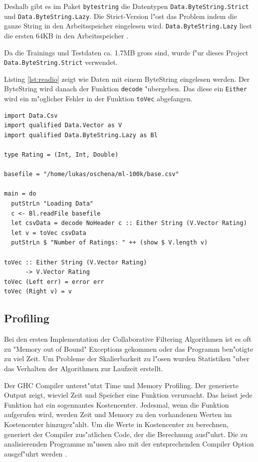 \documentclass[a4paper, 12pt]{article}
\begin{document}
Deshalb gibt es im Paket \verb|bytestring| die Datentypen \verb|Data.ByteString.Strict| und \verb|Data.ByteString.Lazy|. Die Strict-Version l"ost das Problem indem die ganze String in den Arbeitsspeicher eingelesen wird. \verb|Data.ByteString.Lazy| liest die ersten 64KB in den Arbeitsspeicher \cite{Lipovaca}.

Da die Trainings und Testdaten ca. 1.7MB gross sind, wurde f"ur dieses Project \verb|Data.ByteString.Strict| verwendet.

Listing \ref{lst:readio} zeigt wie Daten mit einem ByteString eingelesen werden. Der ByteString wird danach der Funktion \verb|decode| "ubergeben. Das diese ein \verb|Either| wird ein m"oglicher Fehler in der Funktion \verb|toVec| abgefangen.

\begin{lstlisting}[label={lst:readio},caption={Einlesen von Files mit ByteString}]
import Data.Csv
import qualified Data.Vector as V
import qualified Data.ByteString.Lazy as Bl

type Rating = (Int, Int, Double)

basefile = "/home/lukas/oschena/ml-100k/base.csv"

main = do
  putStrLn "Loading Data"
  c <- Bl.readFile basefile
  let csvData = decode NoHeader c :: Either String (V.Vector Rating)
  let v = toVec csvData
  putStrLn $ "Number of Ratings: " ++ (show $ V.length v)

toVec :: Either String (V.Vector Rating)
      -> V.Vector Rating
toVec (Left err) = error err
toVec (Right v) = v
\end{lstlisting}

\subsection{Profiling}
\label{sec:profiling}

Bei den ersten Implementation der Collaborative Filtering Algorithmen ist es oft zu "Memory out of Bound" Exceptions gekommen oder das Programm ben"otigte zu viel Zeit. Um Probleme der Skalierbarkeit zu l"osen wurden Statistiken "uber das Verhalten der Algorithmen zur Laufzeit erstellt.

Der GHC Compiler unterst"utzt Time und Memory Profiling. Der generierte Output zeigt, wieviel Zeit und Speicher eine Funktion verursacht. Das heisst jede Funktion hat ein sogennantes Kostencenter. Jedesmal, wenn die Funktion aufgerufen wird, werden Zeit und Memory zu den vorhandenen Werten im Kostencenter hinzugez"ahlt. Um die Werte in Kostencenter zu berechnen, generiert der Compiler zus"atlichen Code, der die Berechnung ausf"uhrt. Die zu analisierenden Programme m"ussen also mit der entsprechenden Compiler Option ausgef"uhrt werden \cite{Mena}.
\end{document}
